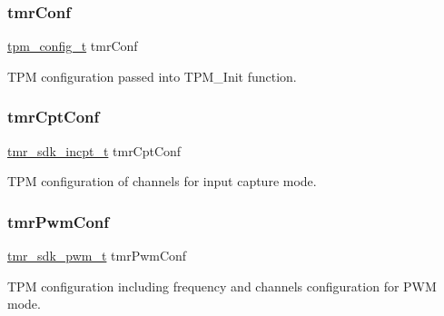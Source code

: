\subsubsection{\texorpdfstring{tmrConf}{tmrConf}}
{\footnotesize\ttfamily \mbox{\hyperlink{group__tpm_ga5647039a18486c876df5cdeb84c9621d}{tpm\+\_\+config\+\_\+t}} tmr\+Conf}

T\+PM configuration passed into T\+P\+M\+\_\+\+Init function. \mbox{\label{group__struct__group_gad49fb6a9677fd308941ceb2302f67468}} 
\subsubsection{\texorpdfstring{tmrCptConf}{tmrCptConf}}
{\footnotesize\ttfamily \mbox{\hyperlink{structtmr__sdk__incpt__t}{tmr\+\_\+sdk\+\_\+incpt\+\_\+t}} tmr\+Cpt\+Conf}

T\+PM configuration of channels for input capture mode. \mbox{\label{group__struct__group_ga8f16a276a8bcee2785e8db1cb8fed1d1}} 
\subsubsection{\texorpdfstring{tmrPwmConf}{tmrPwmConf}}
{\footnotesize\ttfamily \mbox{\hyperlink{structtmr__sdk__pwm__t}{tmr\+\_\+sdk\+\_\+pwm\+\_\+t}} tmr\+Pwm\+Conf}

T\+PM configuration including frequency and channels configuration for P\+WM mode. 